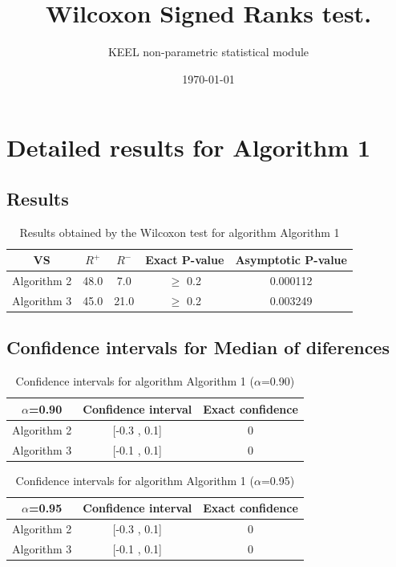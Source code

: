 \documentclass[a4paper,10pt]{article}
\title{Wilcoxon Signed Ranks test.}
\date{\today}
\author{KEEL non-parametric statistical module}
\begin{document}
\pagestyle{empty}
\maketitle
\thispagestyle{empty}



\section{Detailed results for Algorithm 1}


\subsection{Results}

\begin{table}[!htp]
\centering\small
\begin{tabular}{
|c|c|c|c|c|}
\hline
 VS & $R^{+}$ & $R^{-}$ & Exact P-value & Asymptotic P-value \\ \hline 
Algorithm 2 & 48.0 & 7.0 & $\geq$ 0.2 & 0.000112\\ \hline 
Algorithm 3 & 45.0 & 21.0 & $\geq$ 0.2 & 0.003249\\ \hline 

\end{tabular}
\caption{Results obtained by the Wilcoxon test for algorithm Algorithm 1}
\end{table}

\subsection{Confidence intervals for Median of diferences}

\begin{table}[!htp]
\centering\small
\begin{tabular}{
|c|c|c|}
\hline
 $\alpha$=0.90 & Confidence interval & Exact confidence \\ \hline 
Algorithm 2 & [-0.3 , 0.1] & 0\\ \hline 
Algorithm 3 & [-0.1 , 0.1] & 0\\ \hline 

\end{tabular}
\caption{Confidence intervals for algorithm Algorithm 1 ($\alpha$=0.90)}
\end{table}
\begin{table}[!htp]
\centering\small
\begin{tabular}{
|c|c|c|}
\hline
 $\alpha$=0.95 & Confidence interval & Exact confidence \\ \hline 
Algorithm 2 & [-0.3 , 0.1] & 0\\ \hline 
Algorithm 3 & [-0.1 , 0.1] & 0\\ \hline 

\end{tabular}
\caption{Confidence intervals for algorithm Algorithm 1 ($\alpha$=0.95)}
\end{table}
\end{document}
